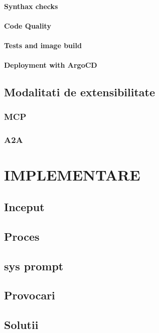 \documentclass[12pt, a4paper, oneside, romanian, draft]{teza-upb}
\begin{document}
      \subsubsection{Synthax checks}
      \subsubsection{Code Quality}
      \subsubsection{Tests and image build}
      \subsubsection{Deployment with ArgoCD}


  \section{Modalitati de extensibilitate}
    \subsection{MCP}
    \subsection{A2A}


\chapter{IMPLEMENTARE}

  \section{Inceput}
  \section{Proces}
  \section{sys prompt}
  \section{Provocari}
  \section{Solutii}
\end{document}
